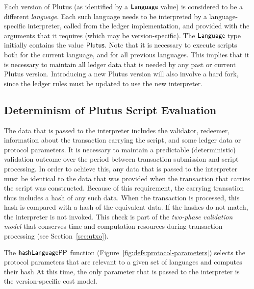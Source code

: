 Each version of Plutus (as identified by a $\mathsf{Language}$ value) is considered to be a different
\emph{language}.  Each such language needs to be interpreted by a language-specific interpreter, called from the ledger implementation,
and provided with the arguments that it requires (which may be version-specific).
The $\mathsf{Language}$ type initially contains the value $\mathsf{Plutus}$.
Note that it is necessary to execute scripts both for the current language, and for all previous languages.
%
This implies that it is necessary to maintain all ledger
data that is needed by any past or current Plutus version. Introducing a new Plutus version will also
involve a hard fork, since the ledger rules must be updated to use the new interpreter.

\subsection{Determinism of Plutus Script Evaluation}
\label{sec:determinism}

The data that is passed to the interpreter
includes the validator, redeemer, information about the transaction carrying
the script, and some ledger data or protocol parameters.
It is necessary to maintain a predictable (deterministic) validation outcome over the period between transaction
submission and script processing.
%
In order to achieve this,
any data that is passed to the interpreter must be
identical to the data that was provided when the transaction that carries the script was
constructed.
Because of this requirement, the carrying transation thus includes a hash of any such data.
When the transaction is processed, this hash is compared with a hash of the equivalent data. If the hashes do not match, the interpreter is not invoked.
This check is part of the \emph{two-phase validation model} that conserves time and computation
resources during transaction processing (see Section~\ref{sec:utxo}).

The $\mathsf{hashLanguagePP}$ function (Figure~\ref{fig:defs:protocol-parameters}) selects the protocol parameters that are relevant to
a given set of languages and computes their hash
%
At this time, the only parameter that is passed to the interpreter is the version-specific cost model.

